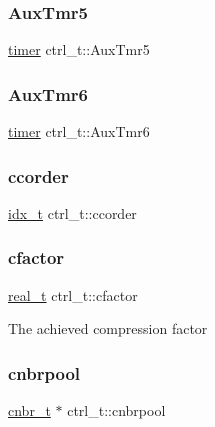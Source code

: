 \mbox{\label{a00742_abe3a6c54cd913122a281df4d0c069867}} 
\subsubsection{\texorpdfstring{Aux\+Tmr5}{AuxTmr5}}
{\footnotesize\ttfamily \hyperlink{a00978_aae821c36bb7e6918e1414484f939c3d4}{timer} ctrl\+\_\+t\+::\+Aux\+Tmr5}

\mbox{\label{a00742_a11d0309701b0ad399b7082b8e213ec6f}} 
\subsubsection{\texorpdfstring{Aux\+Tmr6}{AuxTmr6}}
{\footnotesize\ttfamily \hyperlink{a00978_aae821c36bb7e6918e1414484f939c3d4}{timer} ctrl\+\_\+t\+::\+Aux\+Tmr6}

\mbox{\label{a00742_af126e4254641250b7b8ea571b7cd24b1}} 
\subsubsection{\texorpdfstring{ccorder}{ccorder}}
{\footnotesize\ttfamily \hyperlink{a00876_aaa5262be3e700770163401acb0150f52}{idx\+\_\+t} ctrl\+\_\+t\+::ccorder}

\mbox{\label{a00742_a90cc3aac501d85a6b43edc4b1e7e7e5e}} 
\subsubsection{\texorpdfstring{cfactor}{cfactor}}
{\footnotesize\ttfamily \hyperlink{a00876_a1924a4f6907cc3833213aba1f07fcbe9}{real\+\_\+t} ctrl\+\_\+t\+::cfactor}

The achieved compression factor \mbox{\label{a00742_a87565a0a2d55cb5595a1a9fa4d66d7c2}} 
\subsubsection{\texorpdfstring{cnbrpool}{cnbrpool}}
{\footnotesize\ttfamily \hyperlink{a00714}{cnbr\+\_\+t} $\ast$ ctrl\+\_\+t\+::cnbrpool}

